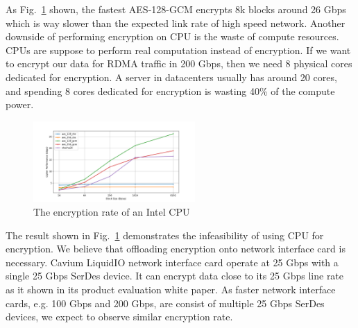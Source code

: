 As Fig.~\ref{fig:cpu_encryption_rate} shown, the fastest AES-128-GCM encrypts 8k blocks around 26 Gbps which is way slower than the expected link rate of high speed network. Another downside of performing encryption on CPU is the waste of compute resources. CPUs are suppose to perform real computation instead of encryption. If we want to encrypt our data for RDMA traffic in 200 Gbps, then we need 8 physical cores dedicated for encryption. A server in datacenters usually has around 20 cores, and spending 8 cores dedicated for encryption is wasting 40\% of the compute power.

\begin{figure}[ht]
    \centering
    \includegraphics[width=0.55\textwidth]{fig/encryption}
    \caption{The encryption rate of an Intel CPU}
    \label{fig:cpu_encryption_rate}
\end{figure}

The result shown in Fig.~\ref{fig:cpu_encryption_rate} demonstrates the infeasibility of using CPU for encryption. We believe that offloading encryption onto network interface card is necessary. Cavium LiquidIO network interface card operate at 25 Gbps with a single 25 Gbps SerDes device. It can encrypt data close to its 25 Gbps line rate as it shown in its product evaluation white paper. As faster network interface cards, e.g. 100 Gbps and 200 Gbps, are consist of multiple 25 Gbps SerDes devices, we expect to observe similar encryption rate.

